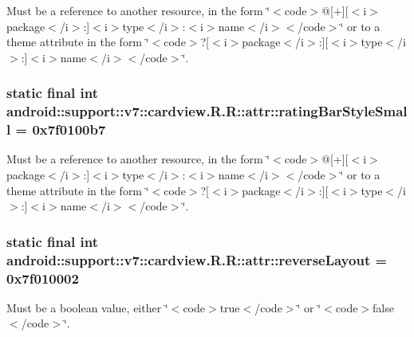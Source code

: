 Must be a reference to another resource, in the form \char`\"{}$<$code$>$@\mbox{[}+\mbox{]}\mbox{[}$<$i$>$package$<$/i$>$:\mbox{]}$<$i$>$type$<$/i$>$:$<$i$>$name$<$/i$>$$<$/code$>$\char`\"{} or to a theme attribute in the form \char`\"{}$<$code$>$?\mbox{[}$<$i$>$package$<$/i$>$:\mbox{]}\mbox{[}$<$i$>$type$<$/i$>$:\mbox{]}$<$i$>$name$<$/i$>$$<$/code$>$\char`\"{}. \hypertarget{classandroid_1_1support_1_1v7_1_1cardview_1_1_r_1_1attr_4c869584ba5340b0190799cb8e3ca25c}{
\subsubsection[{ratingBarStyleSmall}]{\setlength{\rightskip}{0pt plus 5cm}static final int android::support::v7::cardview.R.R::attr::ratingBarStyleSmall = 0x7f0100b7}}
\label{classandroid_1_1support_1_1v7_1_1cardview_1_1_r_1_1attr_4c869584ba5340b0190799cb8e3ca25c}


Must be a reference to another resource, in the form \char`\"{}$<$code$>$@\mbox{[}+\mbox{]}\mbox{[}$<$i$>$package$<$/i$>$:\mbox{]}$<$i$>$type$<$/i$>$:$<$i$>$name$<$/i$>$$<$/code$>$\char`\"{} or to a theme attribute in the form \char`\"{}$<$code$>$?\mbox{[}$<$i$>$package$<$/i$>$:\mbox{]}\mbox{[}$<$i$>$type$<$/i$>$:\mbox{]}$<$i$>$name$<$/i$>$$<$/code$>$\char`\"{}. \hypertarget{classandroid_1_1support_1_1v7_1_1cardview_1_1_r_1_1attr_f4827232ea62f234b16ebe4e05b516b3}{
\subsubsection[{reverseLayout}]{\setlength{\rightskip}{0pt plus 5cm}static final int android::support::v7::cardview.R.R::attr::reverseLayout = 0x7f010002}}
\label{classandroid_1_1support_1_1v7_1_1cardview_1_1_r_1_1attr_f4827232ea62f234b16ebe4e05b516b3}


Must be a boolean value, either \char`\"{}$<$code$>$true$<$/code$>$\char`\"{} or \char`\"{}$<$code$>$false$<$/code$>$\char`\"{}. 

